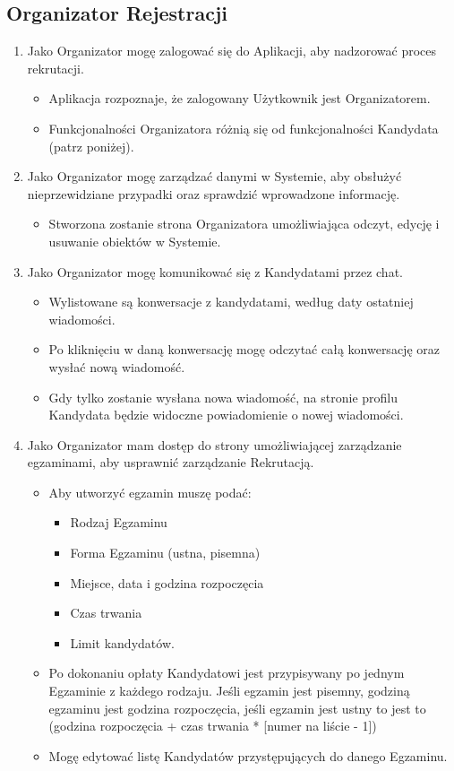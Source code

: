 \documentclass{article}
\begin{document}
\subsection{Organizator Rejestracji}
\begin{enumerate}
  \item Jako Organizator mogę zalogować się do Aplikacji, aby nadzorować proces rekrutacji.
      \begin{itemize}
         \item Aplikacja rozpoznaje, że zalogowany Użytkownik jest Organizatorem.
         \item Funkcjonalności Organizatora różnią się od funkcjonalności Kandydata (patrz poniżej).
       \end{itemize}
  \item Jako Organizator mogę zarządzać danymi w Systemie, aby obsłużyć nieprzewidziane przypadki oraz sprawdzić wprowadzone informację.
      \begin{itemize}
         \item Stworzona zostanie strona Organizatora umożliwiająca odczyt, edycję i usuwanie obiektów w Systemie.
       \end{itemize}
  \item Jako Organizator mogę komunikować się z Kandydatami przez chat.
      \begin{itemize}
         \item Wylistowane są konwersacje z kandydatami, według daty ostatniej wiadomości.
         \item Po kliknięciu w daną konwersację mogę odczytać całą konwersację oraz wysłać nową wiadomość.
         \item Gdy tylko zostanie wysłana nowa wiadomość, na stronie profilu Kandydata będzie widoczne powiadomienie o nowej wiadomości.
       \end{itemize}
  \item Jako Organizator mam dostęp do strony umożliwiającej zarządzanie egzaminami, aby usprawnić zarządzanie Rekrutacją.
      \begin{itemize}
         \item Aby utworzyć egzamin muszę podać: 
            \begin{itemize}
                \item Rodzaj Egzaminu
                \item Forma Egzaminu (ustna, pisemna)
                \item Miejsce, data i godzina rozpoczęcia
                \item Czas trwania
                \item Limit kandydatów.
            \end{itemize}
         \item Po dokonaniu opłaty Kandydatowi jest przypisywany po jednym Egzaminie z każdego rodzaju. Jeśli egzamin jest pisemny, godziną egzaminu jest godzina rozpoczęcia, jeśli egzamin jest ustny to jest to (godzina rozpoczęcia + czas trwania * [numer na liście - 1])
         \item Mogę edytować listę Kandydatów przystępujących do danego Egzaminu.
       \end{itemize}
\end{enumerate}
\end{document}
